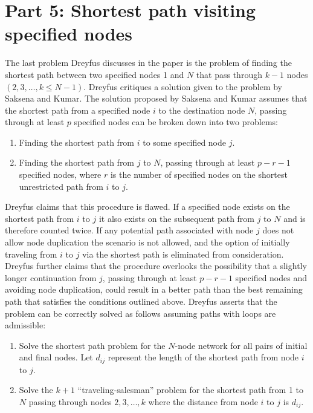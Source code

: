 \documentclass{article}
\begin{document}
\newpage

\section*{Part 5: Shortest path visiting specified nodes}
The last problem Dreyfus discusses in the paper is the problem of
finding the shortest path between two specified nodes 1 and $N$ that pass
through $k-1$ nodes $(2,3,\dots,k \leq N-1)$. Dreyfus critiques a solution given to 
the problem by Saksena and Kumar\cite{kumar}. The solution proposed by Saksena and 
Kumar assumes that the shortest path from a specified node $i$ to the destination 
node $N$, passing through at least $p$ specified nodes can be broken down into two problems:
\begin{enumerate}
    \item Finding the shortest path from $i$ to some specified node $j$.
    \item Finding the shortest path from $j$ to $N$, passing through at 
    least $p-r-1$ specified nodes, where $r$ is the number of 
    specified nodes on the shortest unrestricted path from $i$ to $j$.
\end{enumerate}

\noindent Dreyfus claims that this procedure is flawed. If a specified 
node exists on the shortest path from $i$ to $j$ it also exists on 
the subsequent path from $j$ to $N$ and is therefore counted twice. 
If any potential path associated with node $j$ does not allow node 
duplication the scenario is not allowed, and the option of initially 
traveling from $i$ to $j$ via the shortest path is eliminated from 
consideration. Dreyfus further claims that the procedure overlooks 
the possibility that a slightly longer continuation from $j$, passing 
through at least $p-r-1$ specified nodes and avoiding node duplication, 
could result in a better path than the best remaining path that satisfies 
the conditions outlined above. Dreyfus asserts that the problem can be 
correctly solved as follows assuming paths with loops are admissible: 

\begin{enumerate}
    \item Solve the shortest path problem for the $N$-node network for all pairs of
    initial and final nodes. Let $d_{ij}$ represent the length of the shortest path 
    from node $i$ to $j$.
    \item Solve the $k+1$ “traveling-salesman” problem for the shortest path from 
    1 to $N$ passing through nodes $2, 3, \dots,k$ where the distance from node 
    $i$ to $j$ is $d_{ij}$. 
\end{enumerate}
\end{document}
